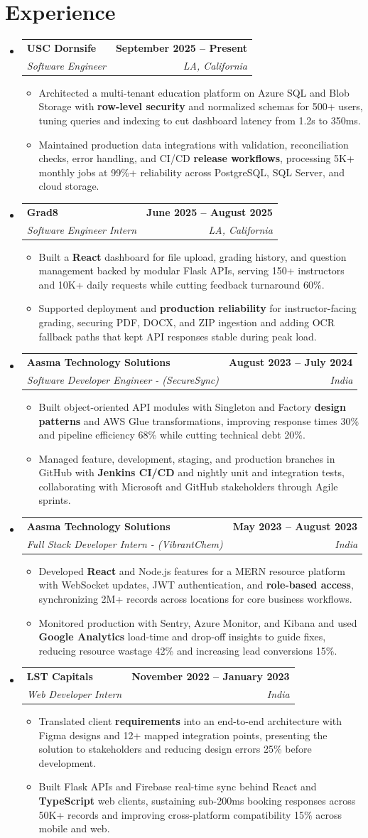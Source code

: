 \documentclass[letterpaper,10pt]{article}
\makeatletter
\newcommand{\itemTail}{\vspace{-4pt}}
\newcommand{\sectionGap}{\vspace{-8pt}}
\newcommand{\roleGap}{\vspace{2pt}}
\newcommand{\resumeItem}[1]{\item\small{{#1 \itemTail}}}
\newcommand{\resumeSubheading}[4]{\vspace{-1pt}\item\begin{tabular*}{1.0\textwidth}[t]{l@{\extracolsep{\fill}}r}\textbf{#1} & \textbf{\small #2} \\\textit{\small#3} & \textit{\small #4} \\\end{tabular*}\vspace{-2pt}}
\newcommand{\resumeSubHeadingListStart}{\begin{itemize}[leftmargin=0.0in, label={}]}
\newcommand{\resumeSubHeadingListEnd}{\end{itemize}}
\newcommand{\resumeItemListStart}{\begin{itemize}[leftmargin=0.15in,label=\textbullet,itemsep=3pt,topsep=0pt,parsep=0pt,partopsep=0pt]}
\newcommand{\resumeItemListEnd}{\end{itemize}\vspace{-4pt}}
\makeatother
\begin{document}
\section{Experience}
\resumeSubHeadingListStart
\resumeSubheading{USC Dornsife}{September 2025 -- Present}{Software Engineer}{LA, California}
\resumeItemListStart
\resumeItem{Architected a multi-tenant education platform on Azure SQL and Blob Storage with \textbf{row-level security} and normalized schemas for 500+ users, tuning queries and indexing to cut dashboard latency from 1.2s to 350ms.}
\resumeItem{Maintained production data integrations with validation, reconciliation checks, error handling, and CI/CD \textbf{release workflows}, processing 5K+ monthly jobs at 99\%+ reliability across PostgreSQL, SQL Server, and cloud storage.}
\resumeItemListEnd
\roleGap
\resumeSubheading{Grad8}{June 2025 -- August 2025}{Software Engineer Intern}{LA, California}
\resumeItemListStart
\resumeItem{Built a \textbf{React} dashboard for file upload, grading history, and question management backed by modular Flask APIs, serving 150+ instructors and 10K+ daily requests while cutting feedback turnaround 60\%.}
\resumeItem{Supported deployment and \textbf{production reliability} for instructor-facing grading, securing PDF, DOCX, and ZIP ingestion and adding OCR fallback paths that kept API responses stable during peak load.}
\resumeItemListEnd
\roleGap
\resumeSubheading{Aasma Technology Solutions}{August 2023 -- July 2024}{Software Developer Engineer - (SecureSync)}{India}
\resumeItemListStart
\resumeItem{Built object-oriented API modules with Singleton and Factory \textbf{design patterns} and AWS Glue transformations, improving response times 30\% and pipeline efficiency 68\% while cutting technical debt 20\%.}
\resumeItem{Managed feature, development, staging, and production branches in GitHub with \textbf{Jenkins CI/CD} and nightly unit and integration tests, collaborating with Microsoft and GitHub stakeholders through Agile sprints.}
\resumeItemListEnd
\roleGap
\resumeSubheading{Aasma Technology Solutions}{May 2023 -- August 2023}{Full Stack Developer Intern - (VibrantChem)}{India}
\resumeItemListStart
\resumeItem{Developed \textbf{React} and Node.js features for a MERN resource platform with WebSocket updates, JWT authentication, and \textbf{role-based access}, synchronizing 2M+ records across locations for core business workflows.}
\resumeItem{Monitored production with Sentry, Azure Monitor, and Kibana and used \textbf{Google Analytics} load-time and drop-off insights to guide fixes, reducing resource wastage 42\% and increasing lead conversions 15\%.}
\resumeItemListEnd
\roleGap
\resumeSubheading{LST Capitals}{November 2022 -- January 2023}{Web Developer Intern}{India}
\resumeItemListStart
\resumeItem{Translated client \textbf{requirements} into an end-to-end architecture with Figma designs and 12+ mapped integration points, presenting the solution to stakeholders and reducing design errors 25\% before development.}
\resumeItem{Built Flask APIs and Firebase real-time sync behind React and \textbf{TypeScript} web clients, sustaining sub-200ms booking responses across 50K+ records and improving cross-platform compatibility 15\% across mobile and web.}
\resumeItemListEnd
\resumeSubHeadingListEnd
\sectionGap
\end{document}
